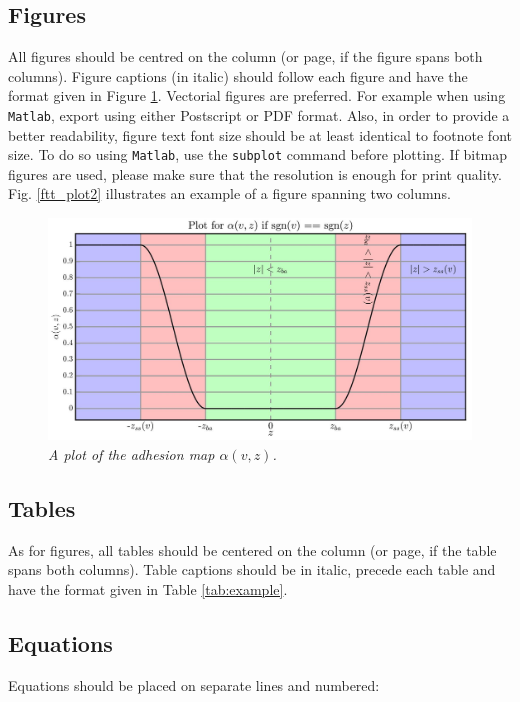 \documentclass[twoside,a4paper]{article}
\begin{document}
\subsection{Figures}
\label{ssec:figures}
All figures should be centred on the column (or page, if the figure spans both columns).
Figure captions (in italic) should follow each figure and have the format given in Figure \ref{fft_plot}.
%
Vectorial figures are preferred. For example when using
\texttt{Matlab}, export using either Postscript or PDF format. Also,
in order to provide a better readability, figure text font size
should be at least identical to footnote font size. To do so using
\texttt{Matlab}, use the \texttt{subplot} command before plotting.
If bitmap figures are used, please make sure that the resolution is
enough for print quality. Fig. \ref{ftt_plot2} illustrates an
example of a figure spanning two columns.
%
\begin{figure}[ht]
\centerline{\includegraphics[width=1.0\columnwidth]{alphaPlot}}
\caption{\label{fft_plot}{\it A plot of the adhesion map $\alpha(v,z)$.}}
\end{figure}


\subsection{Tables}
As for figures, all tables should be centered on the column (or page, if the table spans both columns).
Table captions should be in italic, precede each table and have the format given in Table \ref{tab:example}.

\subsection{Equations}
Equations should be placed on separate lines and numbered:
\end{document}

